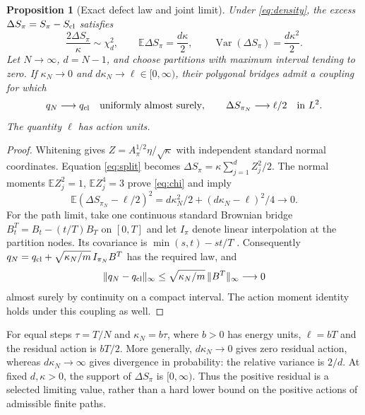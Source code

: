 \documentclass[11pt,a4paper]{article}
\newtheorem{proposition}{Proposition}
\newcommand{\E}{\mathbb E}
\begin{document}
\begin{proposition}[Exact defect law and joint limit]\label{prop:defect}
Under \eqref{eq:density}, the excess $\Delta S_\pi=S_\pi-S_{\rm cl}$ satisfies
\begin{equation}\label{eq:chi}
 \frac{2\Delta S_\pi}{\kappa}\sim\chi_d^2,\qquad
 \E\Delta S_\pi=\frac{d\kappa}{2},\qquad
 \operatorname{Var}(\Delta S_\pi)=\frac{d\kappa^2}{2}.
\end{equation}
Let $N\to\infty$, $d=N-1$, and choose partitions with maximum interval tending
to zero. If $\kappa_N\to0$ and $d\kappa_N\to\ell\in[0,\infty)$, their
polygonal bridges admit a coupling for which
\[
 q_N\longrightarrow q_{\rm cl}\quad\hbox{uniformly almost surely},\qquad
 \Delta S_{\pi_N}\longrightarrow\ell/2\quad\hbox{in }L^2.
\]
The quantity $\ell$ has action units.
\end{proposition}
\begin{proof}
Whitening gives $Z=A_\pi^{1/2}\eta/\sqrt\kappa$ with independent standard
normal coordinates. Equation \eqref{eq:split} becomes
$\Delta S_\pi=\kappa\sum_{j=1}^d Z_j^2/2$. The normal moments
$\E Z_j^2=1$, $\E Z_j^4=3$ prove \eqref{eq:chi} and imply
\[
 \E(\Delta S_{\pi_N}-\ell/2)^2
 =d\kappa_N^2/2+(d\kappa_N-\ell)^2/4\longrightarrow0.
\]
For the path limit, take one continuous standard Brownian bridge
$B_t^T=B_t-(t/T)B_T$ on $[0,T]$ and let $I_\pi$ denote linear interpolation
at the partition nodes. Its covariance is $\min(s,t)-st/T$
\cite[p.~6, (4)--(5)]{PitmanYor2018}. Consequently
$q_N=q_{\rm cl}+\sqrt{\kappa_N/m}\,I_{\pi_N}B^T$ has the required law, and
\[
 \|q_N-q_{\rm cl}\|_\infty
 \le\sqrt{\kappa_N/m}\,\|B^T\|_\infty\longrightarrow0
\]
almost surely by continuity on a compact interval. The action moment identity
holds under this coupling as well.
\end{proof}

For equal steps $\tau=T/N$ and $\kappa_N=b\tau$, where $b>0$ has energy
units, $\ell=bT$ and the residual action is $bT/2$. More generally,
$d\kappa_N\to0$ gives zero residual action, whereas $d\kappa_N\to\infty$
gives divergence in probability: the relative variance is $2/d$.
At fixed $d,\kappa>0$, the support of $\Delta S_\pi$ is $[0,\infty)$.
Thus the positive residual is a selected limiting value, rather than a hard
lower bound on the positive actions of admissible finite paths.
\end{document}
